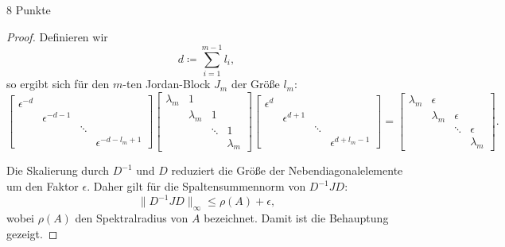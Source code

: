 \documentclass{problemset}
\begin{document}
\begin{problem}{8 Punkte}
\begin{proof}
    Definieren wir
    \[
        d \coloneq \sum_{i = 1}^{m-1} l_i,
    \]
    so ergibt sich für den \( m \)-ten Jordan-Block \( J_m \) der Größe \( l_m
    \):
    \[
        \begin{bmatrix}
            \epsilon^{-d} &                 &        &                         \\
                          & \epsilon^{-d-1} &        &                         \\
                          &                 & \ddots &                         \\
                          &                 &        & \epsilon^{-d - l_m + 1}
        \end{bmatrix}
        \begin{bmatrix}
            \lambda_m & 1         &        &           \\
                      & \lambda_m & 1      &           \\
                      &           & \ddots & 1         \\
                      &           &        & \lambda_m
        \end{bmatrix}
        \begin{bmatrix}
            \epsilon^{d} &                  &        &                        \\
                         & \epsilon^{d + 1} &        &                        \\
                         &                  & \ddots &                        \\
                         &                  &        & \epsilon^{d + l_m - 1}
        \end{bmatrix}
        =
        \begin{bmatrix}
            \lambda_m & \epsilon  &          &           \\
                      & \lambda_m & \epsilon &           \\
                      &           & \ddots   & \epsilon  \\
                      &           &          & \lambda_m
        \end{bmatrix}.
    \]

    Die Skalierung durch \( D^{-1} \) und \( D \) reduziert die Größe der
    Nebendiagonalelemente um den Faktor \( \epsilon \). Daher gilt für die
    Spaltensummennorm von \( D^{-1} J D \):
    \[
        \|D^{-1} J D\|_\infty \leq \rho(A) + \epsilon,
    \]
    wobei \( \rho(A) \) den Spektralradius von \( A \) bezeichnet. Damit ist
    die Behauptung gezeigt.
\end{proof}
\end{problem}
\end{document}
